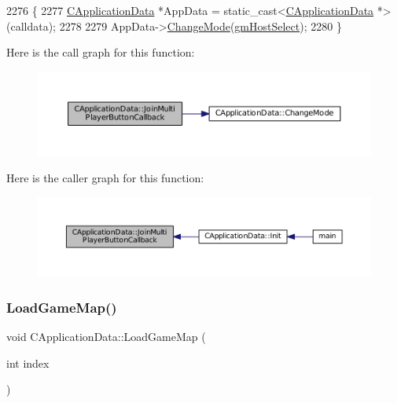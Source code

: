 \begin{DoxyCode}
2276                                                                   \{
2277     \hyperlink{classCApplicationData}{CApplicationData} *AppData = \textcolor{keyword}{static\_cast<}\hyperlink{classCApplicationData}{CApplicationData} *\textcolor{keyword}{>}(calldata);
2278  
2279     AppData->\hyperlink{classCApplicationData_aee18c113e9a0acb3cad3d63eb19de71b}{ChangeMode}(\hyperlink{classCApplicationData_ac8ac37a4c8bb871036fbbdc6a072e403a52495c9194d08aa240ec79eb1e3e0d41}{gmHostSelect});
2280 \}
\end{DoxyCode}
Here is the call graph for this function\+:\nopagebreak
\begin{figure}[H]
\begin{center}
\leavevmode
\includegraphics[width=350pt]{classCApplicationData_a4fa8cf7a67c0ae980d38e1fe7b967f41_cgraph}
\end{center}
\end{figure}
Here is the caller graph for this function\+:\nopagebreak
\begin{figure}[H]
\begin{center}
\leavevmode
\includegraphics[width=350pt]{classCApplicationData_a4fa8cf7a67c0ae980d38e1fe7b967f41_icgraph}
\end{center}
\end{figure}
\hypertarget{classCApplicationData_a89af0c7917be766575720e5ac79c8d2d}{}\label{classCApplicationData_a89af0c7917be766575720e5ac79c8d2d} 
\subsubsection{\texorpdfstring{Load\+Game\+Map()}{LoadGameMap()}}
{\footnotesize\ttfamily void C\+Application\+Data\+::\+Load\+Game\+Map (\begin{DoxyParamCaption}\item[{int}]{index }\end{DoxyParamCaption})\hspace{0.3cm}{\ttfamily [protected]}}



